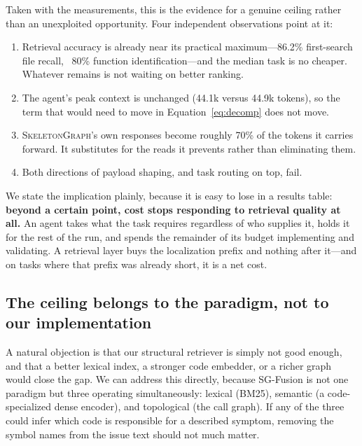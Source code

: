 \documentclass[11pt,letterpaper]{article}
\newcommand{\sg}{\textsc{SkeletonGraph}}
\begin{document}
Taken with the measurements, this is the evidence for a genuine ceiling rather
than an unexploited opportunity. Four independent observations point at it:

\begin{enumerate}
\item Retrieval accuracy is already near its practical maximum---86.2\% first-search
file recall, ~80\% function identification---and the median task is no cheaper.
Whatever remains is not waiting on better ranking.
\item The agent's peak context is unchanged (44.1k versus 44.9k tokens), so the
term that would need to move in Equation~\eqref{eq:decomp} does not move.
\item \sg{}'s own responses become roughly 70\% of the tokens it carries forward.
It substitutes for the reads it prevents rather than eliminating them.
\item Both directions of payload shaping, and task routing on top, fail.
\end{enumerate}

We state the implication plainly, because it is easy to lose in a results table:
\textbf{beyond a certain point, cost stops responding to retrieval quality at
all.} An agent takes what the task requires regardless of who supplies it, holds
it for the rest of the run, and spends the remainder of its budget implementing
and validating. A retrieval layer buys the localization prefix and nothing after
it---and on tasks where that prefix was already short, it is a net cost.

\subsection{The ceiling belongs to the paradigm, not to our implementation}
\label{sec:ceiling}
A natural objection is that our structural retriever is simply not good enough,
and that a better lexical index, a stronger code embedder, or a richer graph
would close the gap. We can address this directly, because SG-Fusion is not
one paradigm but three operating simultaneously: lexical (BM25), semantic (a
code-specialized dense encoder), and topological (the call graph). If any of the
three could infer which code is responsible for a described symptom, removing the
symbol names from the issue text should not much matter.
\end{document}
